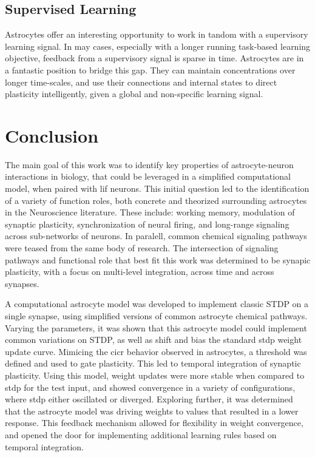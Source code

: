 \section{Supervised Learning}

Astrocytes offer an interesting opportunity to work in tandom with a supervisory
learning signal. In may cases, especially with a longer running task-based
learning objective, feedback from a supervisory signal is sparse in
time. Astrocytes are in a fantastic position to bridge this gap. They can
maintain \ca concentrations over longer time-scales, and use their connections
and internal states to direct plasticity intelligently, given a global and
non-specific learning signal.

\chapter{Conclusion} \label{chapter:conclusion}

The main goal of this work was to identify key properties of astrocyte-neuron
interactions in biology, that could be leveraged in a simplified computational
model, when paired with \gls{lif} neurons. This initial question led to the
identification of a variety of function roles, both concrete and theorized
surrounding astrocytes in the Neuroscience literature. These include: working
memory, modulation of synaptic plasticity, synchronization of neural firing, and
long-range signaling across sub-networks of neurons. In paralell, common
chemical signaling pathways were teased from the same body of
research. The intersection of signaling pathways and functional role that best
fit this work was determined to be synapic plasticity, with a focus on
multi-level integration, across time and across synapses.

A computational astrocyte model was developed to implement classic STDP
on a single synapse, using simplified versions of common astrocyte chemical
pathways. Varying the parameters, it was shown that this astrocyte model could
implement common variations on STDP, as well as shift and bias the standard
\gls{stdp} weight update curve. Mimicing the \gls{cicr} behavior observed in
astrocytes, a threshold was defined and used to gate plasticity. This led to
temporal integration of synaptic plasticity. Using this model, weight updates
were more stable when compared to \gls{stdp} for the test input, and showed
convergence in a variety of configurations, where \gls{stdp} either oscillated
or diverged. Exploring further, it was determined that the astrocyte model was
driving weights to values that resulted in a lower \ca response. This feedback
mechanism allowed for flexibility in weight convergence, and opened the door for
implementing additional learning rules based on temporal integration.

